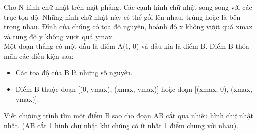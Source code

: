 Cho N hình chữ nhật trên mặt phẳng. Các cạnh hình chữ nhật song song với các trục tọa độ. Những hình chữ nhật này có thể gối lên nhau, trùng hoặc là bên trong nhau. Đỉnh của chúng có tọa độ nguyên, hoành độ x không vượt quá xmax và tung độ y không vượt quá ymax.
\\Một đoạn thẳng có một đầu là điểm A(0, 0) và đầu kia là điểm B. Điểm B thỏa mãn các điều kiện sau:
\begin{itemize}
	\item Các tọa độ của B là những số nguyên.
	\item Điểm B thuộc đoạn [(0, ymax), (xmax, ymax)] hoặc đoạn [(xmax, 0), (xmax, ymax)].
\end{itemize}

Viết chương trình tìm một điểm B sao cho đoạn AB cắt qua nhiều hình chữ nhật nhất. (AB cắt 1 hình chữ nhật khi chúng có ít nhất 1 điểm chung với nhau).